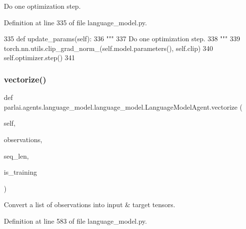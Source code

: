 \begin{DoxyVerb}Do one optimization step.
\end{DoxyVerb}
 

Definition at line 335 of file language\+\_\+model.\+py.


\begin{DoxyCode}
335     \textcolor{keyword}{def }update\_params(self):
336         \textcolor{stringliteral}{"""}
337 \textcolor{stringliteral}{        Do one optimization step.}
338 \textcolor{stringliteral}{        """}
339         torch.nn.utils.clip\_grad\_norm\_(self.model.parameters(), self.clip)
340         self.optimizer.step()
341 
\end{DoxyCode}
\mbox{\label{classparlai_1_1agents_1_1language__model_1_1language__model_1_1LanguageModelAgent_aeddf3a4b207e0668644ce6dfd93f39ef}} 
\subsubsection{\texorpdfstring{vectorize()}{vectorize()}}
{\footnotesize\ttfamily def parlai.\+agents.\+language\+\_\+model.\+language\+\_\+model.\+Language\+Model\+Agent.\+vectorize (\begin{DoxyParamCaption}\item[{}]{self,  }\item[{}]{observations,  }\item[{}]{seq\+\_\+len,  }\item[{}]{is\+\_\+training }\end{DoxyParamCaption})}

\begin{DoxyVerb}Convert a list of observations into input & target tensors.
\end{DoxyVerb}
 

Definition at line 583 of file language\+\_\+model.\+py.


